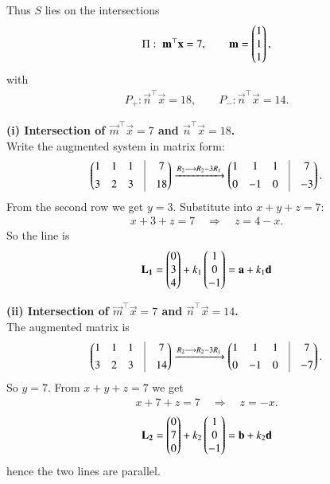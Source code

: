 \documentclass[journal]{IEEEtran}
\begin{document}
Thus $S$ lies on the intersections
\begin{align}
\Pi:\; \mathbf{m}^\top \mathbf{x}=7,\qquad \mathbf{m}=\begin{pmatrix}1\\1\\1\end{pmatrix},
\end{align}
with
\begin{align}
P_+: \vec{n}^\top \vec{x}=18,\qquad P_-:\vec{n}^\top \vec{x}=14.
\end{align}

\textbf{(i) Intersection of $\vec{m}^\top \vec{x}=7$ and $\vec{n}^\top \vec{x}=18$.}\\
Write the augmented system in matrix form:
\begin{align}
\myvec
{1 & 1 & 1 &\vrule& 7\\[4pt]
3 & 2 & 3 &\vrule& 18} \xrightarrow{R_2 \longrightarrow R_2-3R_1}
\myvec{
1 & 1 & 1 &\vrule& 7\\[4pt]
0 & -1 & 0 &\vrule& -3}.
\end{align}
From the second row we get  $y=3$. Substitute into $x+y+z=7$:
\begin{align}
x+3+z=7 \quad\Longrightarrow\quad z=4-x.
\end{align}
So the line is
\begin{align}
\mathbf{L_1} = \begin{pmatrix}0\\3\\4\end{pmatrix} + k_1\begin{pmatrix}1\\0\\-1\end{pmatrix} = \mathbf{a} + k_1 \mathbf{d} 
\end{align}

\textbf{(ii) Intersection of $\vec{m}^\top \vec{x}=7$ and $\vec{n}^\top \vec{x}=14$.}\\
The augmented matrix is
\begin{align}
\myvec
{1 & 1 & 1 &\vrule& 7\\[4pt]
3 & 2 & 3 &\vrule& 14} \xrightarrow{R_2 \longrightarrow R_2-3R_1}
\myvec
{1 & 1 & 1 &\vrule& 7\\[4pt]
0 & -1 & 0 &\vrule& -7}.
\end{align}
So  $y=7$. From $x+y+z=7$ we get
\begin{align}
x+7+z=7 \quad\Longrightarrow\quad z=-x.
\end{align}
\begin{align}
\mathbf{L_2} = \begin{pmatrix}0\\7\\0\end{pmatrix} + k_2\begin{pmatrix}1\\0\\-1\end{pmatrix} = \mathbf{b} + k_2 \mathbf{d}
\end{align}
 hence the two lines are parallel.
 
\end{document}
